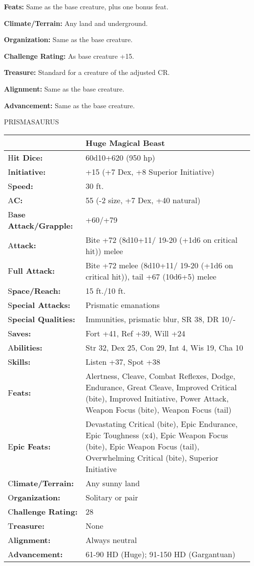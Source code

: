\documentclass{article}
\begin{document}
{\textbf{Feats: }Same as the base creature, plus one bonus feat. 

\textbf{Climate/Terrain:} Any land and underground. 

\textbf{Organization:} Same as the base creature. 

\textbf{Challenge Rating:} As base creature +15.

\textbf{Treasure: }Standard for a creature of the adjusted CR. 

\textbf{Alignment:} Same as the base creature. 

\textbf{Advancement:} Same as the base creature.

\vspace{12pt}
{\LARGE{}PRISMASAURUS }

\begin{tabular}{|>{\raggedright}p{63pt}|>{\raggedright}p{263pt}|}
\hline
  & Huge Magical Beast \tabularnewline
\hline
H\textbf{it Dice:} & 60d10+620 (950 hp) \tabularnewline
\hline
I\textbf{nitiative:} & +15 (+7 Dex, +8 Superior Initiative) \tabularnewline
\hline
S\textbf{peed:} & 30 ft. \tabularnewline
\hline
A\textbf{C:} & 55 (-2 size, +7 Dex, +40 natural) \tabularnewline
\hline
B\textbf{ase Attack/Grapple:} & +60/+79\tabularnewline
\hline
A\textbf{ttack:} & Bite +72 (8d10+11/ 19-20 (+1d6 on critical hit)) melee\tabularnewline
\hline
F\textbf{ull Attack:} & Bite +72 melee (8d10+11/ 19-20 (+1d6 on critical hit)), 
tail +67 (10d6+5) melee\tabularnewline
\hline
S\textbf{pace/Reach:} & 15 ft./10 ft. \tabularnewline
\hline
S\textbf{pecial Attacks:} & Prismatic emanations \tabularnewline
\hline
S\textbf{pecial Qualities:} & Immunities, prismatic blur, SR 38, DR 10/- \tabularnewline
\hline
S\textbf{aves:} & Fort +41, Ref +39, Will +24 \tabularnewline
\hline
A\textbf{bilities:} & Str 32, Dex 25, Con 29, Int 4, Wis 19, Cha 10 \tabularnewline
\hline
S\textbf{kills:} & Listen +37, Spot +38\tabularnewline
\hline
F\textbf{eats:} & Alertness, Cleave, Combat Reflexes, Dodge, Endurance, Great Cleave, 
Improved Critical (bite), Improved Initiative, Power Attack, Weapon Focus (bite), 
Weapon Focus (tail) \tabularnewline
\hline
E\textbf{pic Feats:} & Devastating Critical (bite), Epic Endurance, Epic Toughness 
(x4), Epic Weapon Focus (bite), Epic Weapon Focus (tail), Overwhelming Critical 
(bite), Superior Initiative \tabularnewline
\hline
C\textbf{limate/Terrain:} & Any sunny land \tabularnewline
\hline
O\textbf{rganization:} & Solitary or pair \tabularnewline
\hline
C\textbf{hallenge Rating:} & 28 \tabularnewline
\hline
T\textbf{reasure:} & None \tabularnewline
\hline
A\textbf{lignment:} & Always neutral \tabularnewline
\hline
A\textbf{dvancement:} & 61-90 HD (Huge); 91-150 HD (Gargantuan) \tabularnewline
\hline
\end{tabular}

}
\end{document}
